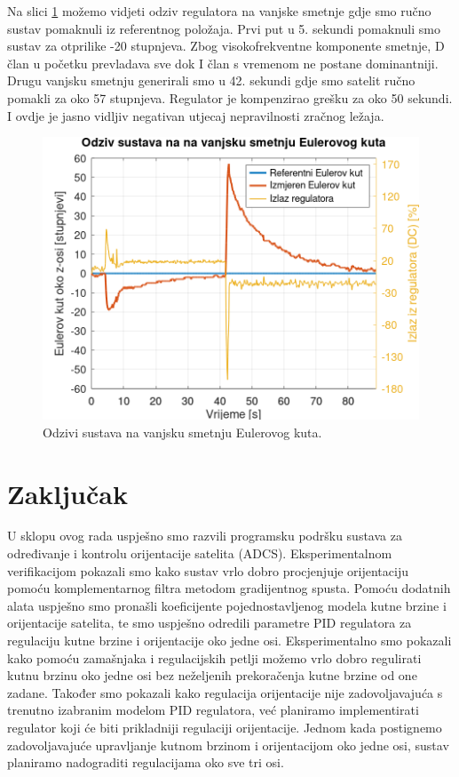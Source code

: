 \documentclass[times, utf8, diplomski, numeric]{templates/template}
\begin{document}
{{        Na slici \ref{fig:angle_reg_dist} možemo vidjeti odziv regulatora na vanjske smetnje gdje smo ručno sustav pomaknuli iz referentnog položaja. Prvi put u 5. sekundi pomaknuli smo sustav za otprilike -20 stupnjeva. Zbog visokofrekventne komponente smetnje, D član u početku prevladava sve dok I član s vremenom ne postane dominantniji. Drugu vanjsku smetnju generirali smo u 42. sekundi gdje smo satelit ručno pomakli za oko 57 stupnjeva. Regulator je kompenzirao grešku za oko 50 sekundi. I ovdje je jasno vidljiv negativan utjecaj nepravilnosti zračnog ležaja. 

        \begin{figure}[h!]
        \centering
        \includegraphics[width=.82\textwidth]{other/angle_reg_dist.png}
        \caption{Odzivi sustava na vanjsku smetnju Eulerovog kuta.}
        \label{fig:angle_reg_dist}
        \end{figure}
    }
}

\chapter{Zaključak}{
    U sklopu ovog rada uspješno smo razvili programsku podršku sustava za određivanje i kontrolu orijentacije satelita (ADCS). Eksperimentalnom verifikacijom pokazali smo kako sustav vrlo dobro procjenjuje orijentaciju pomoću komplementarnog filtra metodom gradijentnog spusta. Pomoću dodatnih alata uspješno smo pronašli koeficijente pojednostavljenog modela kutne brzine i orijentacije satelita, te smo uspješno odredili parametre PID regulatora za regulaciju kutne brzine i orijentacije oko jedne osi. Eksperimentalno smo pokazali kako pomoću zamašnjaka i regulacijskih petlji možemo vrlo dobro regulirati kutnu brzinu oko jedne osi bez neželjenih prekoračenja kutne brzine od one zadane. Također smo pokazali kako regulacija orijentacije nije zadovoljavajuća s trenutno izabranim modelom PID regulatora, već planiramo implementirati regulator koji će biti prikladniji regulaciji orijentacije. Jednom kada postignemo zadovoljavajuće upravljanje kutnom brzinom i orijentacijom oko jedne osi, sustav planiramo nadograditi regulacijama oko sve tri osi.
}
\end{document}
